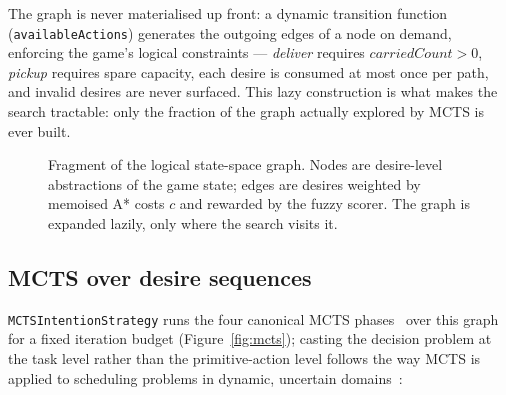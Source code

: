 The graph is never materialised up front: a dynamic transition function
(\texttt{availableActions}) generates the outgoing edges of a node on demand, enforcing the
game's logical constraints --- \emph{deliver} requires $\mathit{carriedCount} > 0$,
\emph{pickup} requires spare capacity, each desire is consumed at most once per path, and
invalid desires are never surfaced. This lazy construction is what makes the search tractable:
only the fraction of the graph actually explored by MCTS is ever built.

\begin{figure}[htbp]
\centering
{}
\caption{Fragment of the logical state-space graph. Nodes are desire-level abstractions of the
game state; edges are desires weighted by memoised A* costs $c$ and rewarded by the fuzzy
scorer. The graph is expanded lazily, only where the search visits it.}
\label{fig:stategraph}
\end{figure}

\subsection{MCTS over desire sequences}
\texttt{MCTSIntentionStrategy} runs the four canonical MCTS
phases~\cite{swiechowski2023mcts} over this graph for a fixed iteration budget
(Figure~\ref{fig:mcts}); casting the decision problem at the task level rather than the
primitive-action level follows the way MCTS is applied to scheduling problems in dynamic,
uncertain domains~\cite{norman2024satellite,liu2025fooddelivery}:

